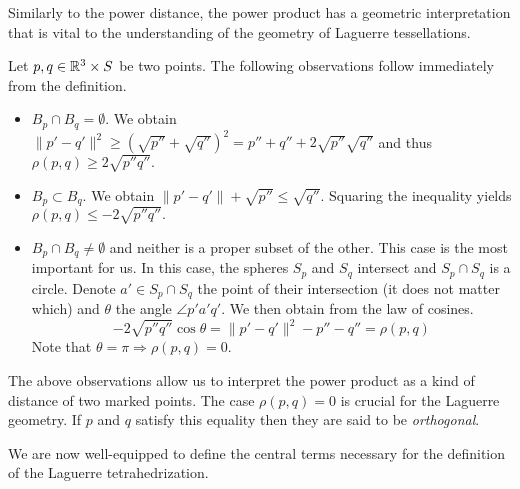 Similarly to the power distance, the power product has a geometric interpretation that is vital to the understanding of the geometry of Laguerre tessellations.

\begin{remark}
Let $p,q \in {\mathbb R^3}\times S$ be two points. The following observations follow immediately from the definition. 
\begin{itemize}
	\item $B_p\cap B_q = \emptyset$. We obtain $\|p'-q'\|^2 \geq (\sqrt{p''} + \sqrt{q''})^2 = p'' + q'' + 2\sqrt{p''}\sqrt{q''}$ and thus $\rho(p,q) \geq 2\sqrt{p'' q''}.$ 
	\item $B_p \subset B_q$. We obtain $\|p'-q'\| + \sqrt{p''} \leq \sqrt{q''} $. Squaring the inequality yields $\rho(p,q) \leq -2\sqrt{p'' q''}.$ 
	\item $B_p \cap B_q \neq \emptyset$ and neither is a proper subset of the other. This case is the most important for us. In this case, the spheres $S_p$ and $S_q$ intersect and $S_p\cap S_q$ is a circle. Denote $a' \in S_p \cap S_q$ the point of their intersection (it does not matter which) and $\theta$ the angle $\angle p'a'q'$. We then obtain from the law of cosines. 
	$$- 2\sqrt{p'' q''}\cos \theta = \|p'-q'\|^2 - p'' - q'' = \rho(p,q)$$
	Note that $\theta = \pi \Rightarrow \rho(p,q)=0$.
\end{itemize}
\end{remark}

The above observations allow us to interpret the power product as a kind of distance of two marked points. The case $\rho(p,q)=0$ is crucial for the Laguerre geometry. If $p$ and $q$ satisfy this equality then they are said to be \textit{orthogonal}. 

We are now well-equipped to define the central terms necessary for the definition of the Laguerre tetrahedrization.

